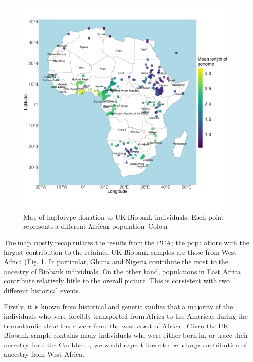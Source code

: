 \begin{figure}[htp]
    \centering
    \includegraphics[width=1.0\textwidth]{../images/chapter3/haplotype_sharing_map_zoomed_II.pdf}
    \caption{Map of haplotype donation to UK Biobank individuals. Each point represents a different African population. Colour }
    \label{fig:haplotype_sharing_map_zoomed_II}
\end{figure}

The map mostly recapitulates the results from the PCA; the populations with the largest contribution to the retained UK Biobank samples are those from West Africa (Fig. \ref{fig:haplotype_sharing_map_zoomed_II}. In particular, Ghana and Nigeria contribute the most to the ancestry of Biobank individuals. On the other hand, populations in East Africa contribute relatively little to the overall picture. This is consistent with two different historical events. 

Firstly, it is known from historical and genetic studies that a majority of the individuals who were forcibly transported from Africa to the Americas during the transatlantic slave trade were from the west coast of Africa \cite{micheletti2020genetic}. Given the UK Biobank sample contains many individuals who were either born in, or trace their ancestry from the Caribbean, we would expect there to be a large contribution of ancestry from West Africa.

